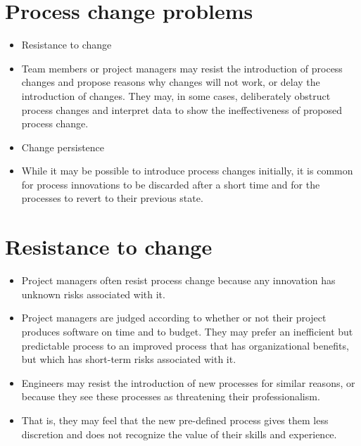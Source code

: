 \section{Process change problems}
\begin{itemize}

\item Resistance to change

   \item Team members or project managers may resist the introduction of process changes and propose reasons why changes will not work, or delay the introduction of changes. They may, in some cases, deliberately obstruct process changes and interpret data to show the ineffectiveness of proposed process change.

\item Change persistence

   \item While it may be possible to introduce process changes initially, it is common for process innovations to be discarded after a short time and for the processes to revert to their previous state.

\end{itemize}

\section{Resistance to change}
\begin{itemize}

\item Project managers often resist process change because any innovation has unknown risks associated with it.

   \item Project managers are judged according to whether or not their project produces software on time and to budget. They may prefer an inefficient but predictable process to an improved process that has organizational benefits, but which has short-term risks associated with it.

\item Engineers may resist the introduction of new processes for similar reasons, or because they see these processes as threatening their professionalism.

   \item That is, they may feel that the new pre-defined process gives them less discretion and does not recognize the value of their skills and experience.

\end{itemize}

